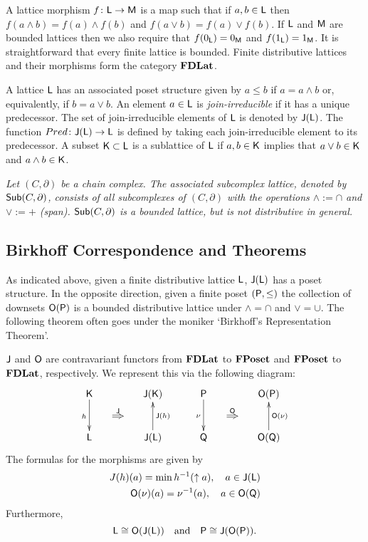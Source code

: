 A lattice morphism $f \colon {\mathsf L}\to {\mathsf M}$ is a map such that if $a,b\in {\mathsf L}$ then $f(a\wedge b) = f(a)\wedge f(b)$ and $f(a\vee b) = f(a)\vee f(b)$.  
If ${\mathsf L}$ and ${\mathsf M}$ are bounded lattices then we also require that $f(0_{\mathsf L})=0_{\mathsf M}$ and $f(1_{\mathsf L})=1_{\mathsf M}$.    
It is straightforward that every finite lattice is bounded. 
Finite distributive lattices and their morphisms form the category ${\bf FDLat}$.

A lattice ${\mathsf L}$ has an associated poset structure given by $a\leq b$ if $a=a\wedge b$ or, equivalently, if $b=a\vee b$.
An element $a\in {\mathsf L}$ is {\em join-irreducible} if it has a unique predecessor.   
The set of join-irreducible elements of ${\mathsf L}$ is denoted by ${\mathsf J}({\mathsf L})$.
The function $Pred \colon {\mathsf J}({\mathsf L})\to {\mathsf L}$ is defined by taking each join-irreducible element to its predecessor.  
A subset ${\mathsf K}\subset {\mathsf L}$ is  a sublattice of ${\mathsf L}$ if $a,b\in {\mathsf K}$ implies that $a\vee b\in {\mathsf K}$ and $a\wedge b\in {\mathsf K}$.  

\begin{ex}
{\em
Let $(C,\partial)$ be a chain complex.  
The associated \emph{subcomplex lattice}, denoted by $\mathsf{Sub}(C,\partial)$, consists of all  subcomplexes of $(C,\partial)$ with the operations $\wedge := \cap$ and $\vee := +$ (span).
$\mathsf{Sub}(C,\partial)$ is a bounded lattice, but  is not distributive in general.
}
\end{ex}

\subsection{Birkhoff Correspondence and Theorems}\label{sec:birkhoff}
As indicated above, given a finite distributive lattice ${\mathsf L}$,  ${\mathsf J}({\mathsf L})$ has a poset structure.
In the opposite direction, given a finite poset $({\mathsf P},\leq)$ the collection of downsets ${\mathsf O}({\mathsf P})$ is a bounded distributive lattice under $\wedge = \cap$ and $\vee = \cup$.  The following theorem often goes under the moniker `Birkhoff's Representation Theorem'.

\begin{thm}\label{thm:birkhoff}
${\mathsf J}$ and ${\mathsf O}$ are contravariant functors from ${\bf FDLat}$ to ${\bf FPoset}$ and ${\bf FPoset}$ to ${\bf FDLat}$, respectively.  We represent this via the following diagram:
\[
\xymatrixrowsep{0.15in}
\xymatrixcolsep{0.15in}
\xymatrix{
\sK \ar[dd]_{h} && & \sJ(\sK) \\
& \ar@{=>}[r]^{\sJ}  &&\\
\sL &&& \sJ(\sL) \ar[uu]_{\sJ(h)}
}\quad\quad
\xymatrix{
\sP \ar[dd]_{\nu} &&& \sO(\sP) \\
&  \ar@{=>}[r]^{\sO} &\\
\sQ &&& \sO(\sQ) \ar[uu]_{\sO(\nu)}
}
\]
The formulas for the morphisms are given by
\begin{align*}
J(h)(a) = \min h^{-1}(\uparrow a),\quad a\in {\mathsf J}({\mathsf L})\\
{\mathsf O}(\nu)(a) = \nu^{-1}(a), \quad a\in {\mathsf O}({\mathsf Q})
\end{align*}
Furthermore,
\[
{\mathsf L}\cong {\mathsf O}({\mathsf J}({\mathsf L}))\quad\text{and}\quad {\mathsf P}\cong {\mathsf J}({\mathsf O}({\mathsf P})).
\]
\end{thm}

